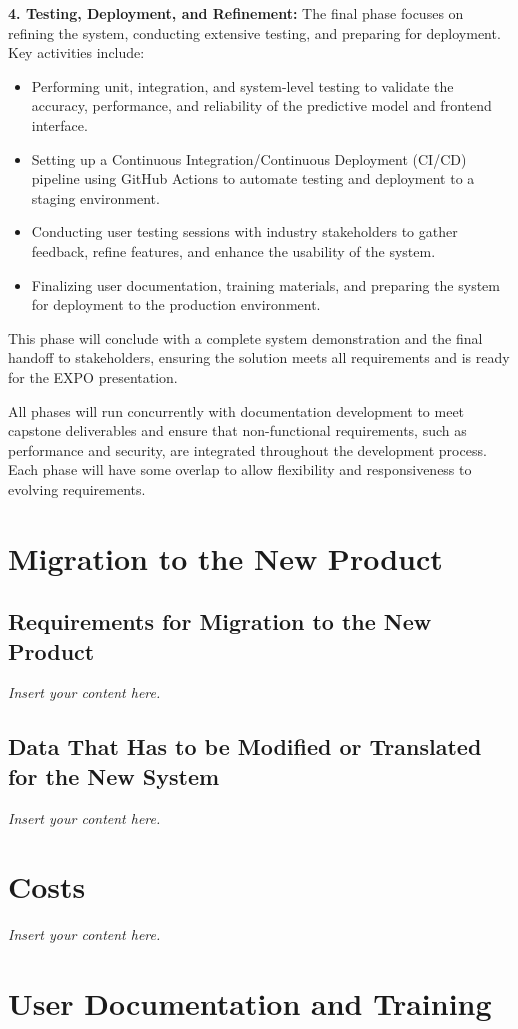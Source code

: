 \documentclass[12pt]{article}
\newcommand{\lips}{\textit{Insert your content here.}}
\begin{document}
\textbf{4. Testing, Deployment, and Refinement:} The final phase focuses on
refining the system, conducting extensive testing, and preparing for deployment.
Key activities include:
\begin{itemize}
    \item Performing unit, integration, and system-level testing to validate the
    accuracy, performance, and reliability of the predictive model and frontend
    interface.
    \item Setting up a Continuous Integration/Continuous Deployment (CI/CD)
    pipeline using GitHub Actions to automate testing and deployment to a
    staging environment.
    \item Conducting user testing sessions with industry stakeholders to gather
    feedback, refine features, and enhance the usability of the system.
    \item Finalizing user documentation, training materials, and preparing the
    system for deployment to the production environment.
\end{itemize}
This phase will conclude with a complete system demonstration and the final
handoff to stakeholders, ensuring the solution meets all requirements and is
ready for the EXPO presentation.

All phases will run concurrently with documentation development to meet capstone
deliverables and ensure that non-functional requirements, such as performance
and security, are integrated throughout the development process. Each phase will
have some overlap to allow flexibility and responsiveness to evolving
requirements.


\section{Migration to the New Product}
\subsection{Requirements for Migration to the New Product}
\lips
\subsection{Data That Has to be Modified or Translated for the New System}
\lips

\section{Costs}
\lips
\section{User Documentation and Training}
\end{document}

